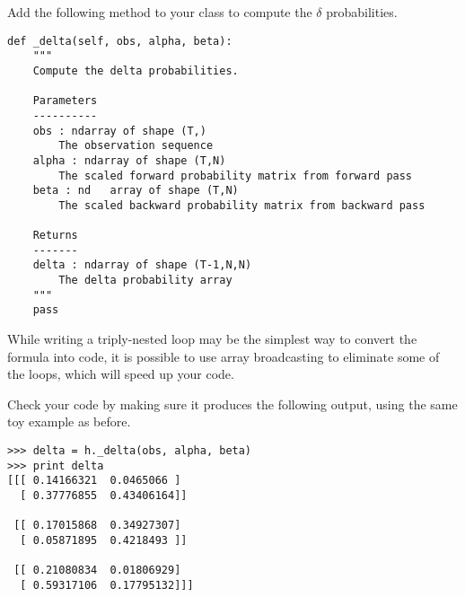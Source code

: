 \begin{problem}
Add the following method to your class to compute the $\delta$ probabilities.
\begin{lstlisting}
def _delta(self, obs, alpha, beta):
    """
    Compute the delta probabilities.

    Parameters
    ----------
    obs : ndarray of shape (T,)
        The observation sequence
    alpha : ndarray of shape (T,N)
        The scaled forward probability matrix from forward pass
    beta : nd   array of shape (T,N)
        The scaled backward probability matrix from backward pass

    Returns
    -------
    delta : ndarray of shape (T-1,N,N)
        The delta probability array
    """
    pass
\end{lstlisting}
While writing a triply-nested loop may be the simplest way to convert the formula into code,
it is possible to use array broadcasting to eliminate some of the loops, which will speed up your code.

Check your code by making sure it produces the following output, using the same toy example as before.
\begin{lstlisting}
>>> delta = h._delta(obs, alpha, beta)
>>> print delta
[[[ 0.14166321  0.0465066 ]
  [ 0.37776855  0.43406164]]

 [[ 0.17015868  0.34927307]
  [ 0.05871895  0.4218493 ]]

 [[ 0.21080834  0.01806929]
  [ 0.59317106  0.17795132]]]
\end{lstlisting}
\end{problem}

